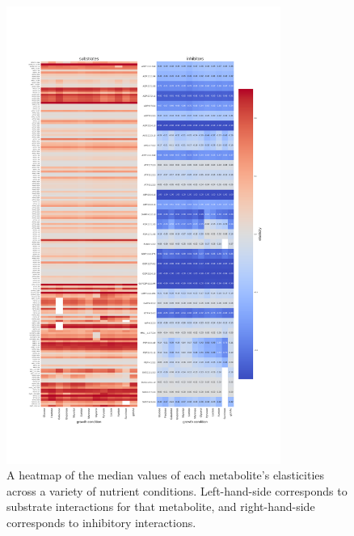 \documentclass[12pt,a4paper]{article}
\begin{document}
\begin{figure}[ht!]
	\includegraphics[width=0.8\textwidth]{../manuscript/figS5.pdf}
	\caption{A heatmap of the median values of each metabolite's elasticities across a variety of nutrient conditions. Left-hand-side corresponds to substrate interactions for that metabolite, and right-hand-side corresponds to inhibitory interactions.
}
\end{figure}
\end{document}
